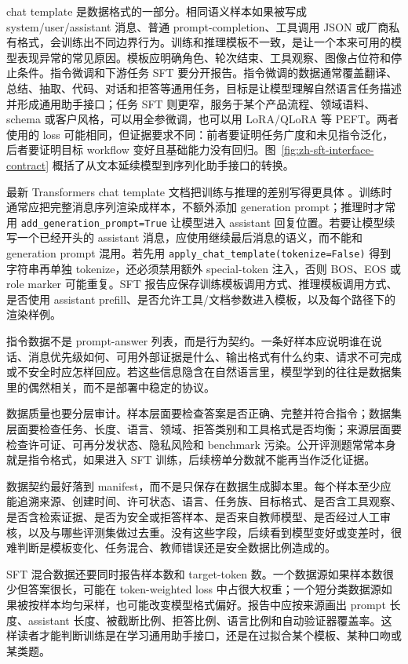 \documentclass[UTF8,zihao=-4,openany]{ctexbook}
\begin{document}
chat template 是数据格式的一部分。相同语义样本如果被写成 system/user/assistant 消息、普通 prompt-completion、工具调用 JSON 或厂商私有格式，会训练出不同边界行为。训练和推理模板不一致，是让一个本来可用的模型表现异常的常见原因。模板应明确角色、轮次结束、工具观察、图像占位符和停止条件。指令微调和下游任务 SFT 要分开报告。指令微调的数据通常覆盖翻译、总结、抽取、代码、对话和拒答等通用任务，目标是让模型理解自然语言任务描述并形成通用助手接口；任务 SFT 则更窄，服务于某个产品流程、领域语料、schema 或客户风格，可以用全参微调，也可以用 LoRA/QLoRA 等 PEFT。两者使用的 loss 可能相同，但证据要求不同：前者要证明任务广度和未见指令泛化，后者要证明目标 workflow 变好且基础能力没有回归。图~\ref{fig:zh-sft-interface-contract} 概括了从文本延续模型到序列化助手接口的转换。

最新 Transformers chat template 文档把训练与推理的差别写得更具体 \cite{huggingface2026chattemplates}。训练时通常应把完整消息序列渲染成样本，不额外添加 generation prompt；推理时才常用 \texttt{add\_generation\_prompt=True} 让模型进入 assistant 回复位置。若要让模型续写一个已经开头的 assistant 消息，应使用继续最后消息的语义，而不能和 generation prompt 混用。若先用 \texttt{apply\_chat\_template(tokenize=False)} 得到字符串再单独 tokenize，还必须禁用额外 special-token 注入，否则 BOS、EOS 或 role marker 可能重复。SFT 报告应保存训练模板调用方式、推理模板调用方式、是否使用 assistant prefill、是否允许工具/文档参数进入模板，以及每个路径下的渲染样例。

指令数据不是 prompt-answer 列表，而是行为契约。一条好样本应说明谁在说话、消息优先级如何、可用外部证据是什么、输出格式有什么约束、请求不可完成或不安全时应怎样回应。若这些信息隐含在自然语言里，模型学到的往往是数据集里的偶然相关，而不是部署中稳定的协议。

数据质量也要分层审计。样本层面要检查答案是否正确、完整并符合指令；数据集层面要检查任务、长度、语言、领域、拒答类别和工具格式是否均衡；来源层面要检查许可证、可再分发状态、隐私风险和 benchmark 污染。公开评测题常常本身就是指令格式，如果进入 SFT 训练，后续榜单分数就不能再当作泛化证据。

数据契约最好落到 manifest，而不是只保存在数据生成脚本里。每个样本至少应能追溯来源、创建时间、许可状态、语言、任务族、目标格式、是否含工具观察、是否含检索证据、是否为安全或拒答样本、是否来自教师模型、是否经过人工审核，以及与哪些评测集做过去重。没有这些字段，后续看到模型变好或变差时，很难判断是模板变化、任务混合、教师错误还是安全数据比例造成的。

SFT 混合数据还要同时报告样本数和 target-token 数。一个数据源如果样本数很少但答案很长，可能在 token-weighted loss 中占很大权重；一个短分类数据源如果被按样本均匀采样，也可能改变模型格式偏好。报告中应按来源画出 prompt 长度、assistant 长度、被截断比例、拒答比例、语言比例和自动验证器覆盖率。这样读者才能判断训练是在学习通用助手接口，还是在过拟合某个模板、某种口吻或某类题。
\end{document}
